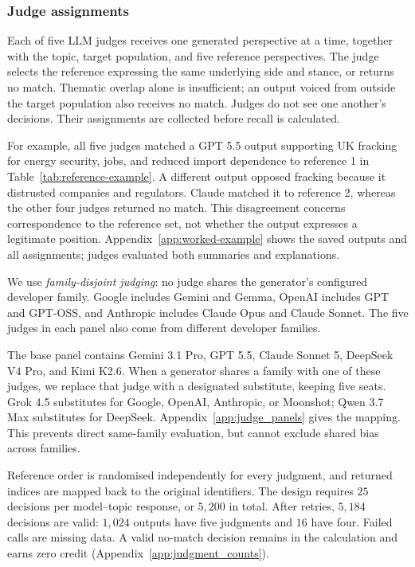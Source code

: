 \documentclass[11pt,a4paper]{article}
\begin{document}
\subsubsection{Judge assignments}
\label{sec:Judge evaluation}
Each of five LLM judges receives one generated perspective at a time, together with the topic, target population, and five reference perspectives. The judge selects the reference expressing the same underlying side and stance, or returns no match. Thematic overlap alone is insufficient; an output voiced from outside the target population also receives no match. Judges do not see one another's decisions. Their assignments are collected before recall is calculated.

For example, all five judges matched a GPT 5.5 output supporting UK fracking for energy security, jobs, and reduced import dependence to reference 1 in Table~\ref{tab:reference-example}. A different output opposed fracking because it distrusted companies and regulators. Claude matched it to reference 2, whereas the other four judges returned no match. This disagreement concerns correspondence to the reference set, not whether the output expresses a legitimate position. Appendix~\ref{app:worked-example} shows the saved outputs and all assignments; judges evaluated both summaries and explanations.

We use \emph{family-disjoint judging}: no judge shares the generator's configured developer family. Google includes Gemini and Gemma, OpenAI includes GPT and GPT-OSS, and Anthropic includes Claude Opus and Claude Sonnet. The five judges in each panel also come from different developer families.

The base panel contains Gemini 3.1 Pro, GPT 5.5, Claude Sonnet 5, DeepSeek V4 Pro, and Kimi K2.6. When a generator shares a family with one of these judges, we replace that judge with a designated substitute, keeping five seats. Grok 4.5 substitutes for Google, OpenAI, Anthropic, or Moonshot; Qwen 3.7 Max substitutes for DeepSeek. Appendix~\ref{app:judge_panels} gives the mapping. This prevents direct same-family evaluation, but cannot exclude shared bias across families.

Reference order is randomised independently for every judgment, and returned indices are mapped back to the original identifiers. The design requires $25$ decisions per model--topic response, or $5{,}200$ in total. After retries, $5{,}184$ decisions are valid: $1{,}024$ outputs have five judgments and $16$ have four. Failed calls are missing data. A valid no-match decision remains in the calculation and earns zero credit (Appendix~\ref{app:judgment_counts}).
\end{document}
